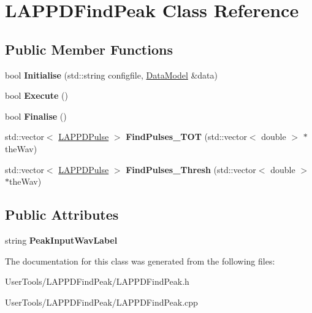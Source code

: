 \hypertarget{classLAPPDFindPeak}{
\section{LAPPDFindPeak Class Reference}
\label{classLAPPDFindPeak}
}
\subsection*{Public Member Functions}
\begin{DoxyCompactItemize}
\item 
\hypertarget{classLAPPDFindPeak_aac02ab0efc1d6f2ac438a50a6dd48b51}{
bool {\bfseries Initialise} (std::string configfile, \hyperlink{classDataModel}{DataModel} \&data)}
\label{classLAPPDFindPeak_aac02ab0efc1d6f2ac438a50a6dd48b51}

\item 
\hypertarget{classLAPPDFindPeak_aeb178a0e7f0182bcec6aec80de1fd80c}{
bool {\bfseries Execute} ()}
\label{classLAPPDFindPeak_aeb178a0e7f0182bcec6aec80de1fd80c}

\item 
\hypertarget{classLAPPDFindPeak_a1c31ce2e8918e04c9e051a8c7eef304c}{
bool {\bfseries Finalise} ()}
\label{classLAPPDFindPeak_a1c31ce2e8918e04c9e051a8c7eef304c}

\item 
\hypertarget{classLAPPDFindPeak_aec4e759a18ce8bd5eda0ed4c1460ea4d}{
std::vector$<$ \hyperlink{classLAPPDPulse}{LAPPDPulse} $>$ {\bfseries FindPulses\_\-TOT} (std::vector$<$ double $>$ $\ast$theWav)}
\label{classLAPPDFindPeak_aec4e759a18ce8bd5eda0ed4c1460ea4d}

\item 
\hypertarget{classLAPPDFindPeak_a705d781b236ed980dc6f6d4a297a5761}{
std::vector$<$ \hyperlink{classLAPPDPulse}{LAPPDPulse} $>$ {\bfseries FindPulses\_\-Thresh} (std::vector$<$ double $>$ $\ast$theWav)}
\label{classLAPPDFindPeak_a705d781b236ed980dc6f6d4a297a5761}

\end{DoxyCompactItemize}
\subsection*{Public Attributes}
\begin{DoxyCompactItemize}
\item 
\hypertarget{classLAPPDFindPeak_a65501ad571e2fa607ba84239eab718af}{
string {\bfseries PeakInputWavLabel}}
\label{classLAPPDFindPeak_a65501ad571e2fa607ba84239eab718af}

\end{DoxyCompactItemize}


The documentation for this class was generated from the following files:\begin{DoxyCompactItemize}
\item 
UserTools/LAPPDFindPeak/LAPPDFindPeak.h\item 
UserTools/LAPPDFindPeak/LAPPDFindPeak.cpp\end{DoxyCompactItemize}
